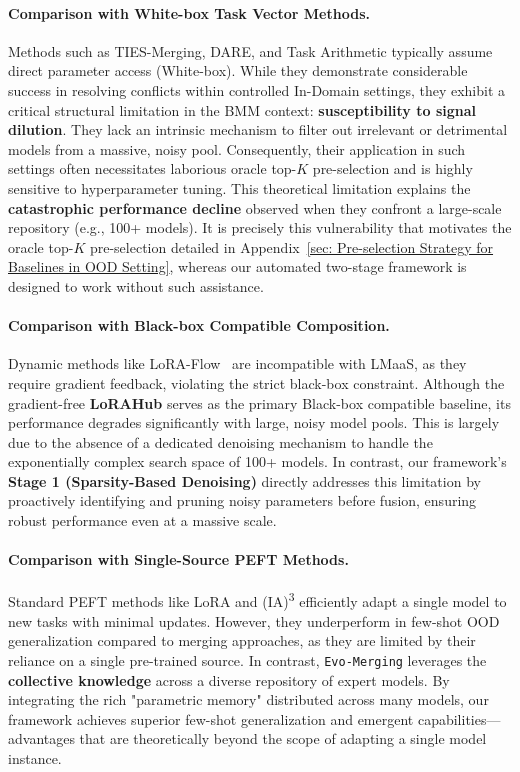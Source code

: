 \paragraph{Comparison with White-box Task Vector Methods.}
Methods such as TIES-Merging, DARE, and Task Arithmetic typically assume direct parameter access (White-box). While they demonstrate considerable success in resolving conflicts within controlled In-Domain settings, they exhibit a critical structural limitation in the BMM context: \textbf{susceptibility to signal dilution}. 
They lack an intrinsic mechanism to filter out irrelevant or detrimental models from a massive, noisy pool. Consequently, their application in such settings often necessitates laborious oracle top-$K$ pre-selection and is highly sensitive to hyperparameter tuning. This theoretical limitation explains the \textbf{catastrophic performance decline} observed when they confront a large-scale repository (e.g., 100+ models). It is precisely this vulnerability that motivates the oracle top-$K$ pre-selection detailed in Appendix~\ref{sec: Pre-selection Strategy for Baselines in OOD Setting}, whereas our automated two-stage framework is designed to work without such assistance.

\paragraph{Comparison with Black-box Compatible Composition.}
Dynamic methods like LoRA-Flow~\cite{wang2024flow} are incompatible with LMaaS, as they require gradient feedback, violating the strict black-box constraint. 
Although the gradient-free \textbf{LoRAHub} serves as the primary Black-box compatible baseline, its performance degrades significantly with large, noisy model pools. This is largely due to the absence of a dedicated denoising mechanism to handle the exponentially complex search space of 100+ models. 
In contrast, our framework's \textbf{Stage 1 (Sparsity-Based Denoising)} directly addresses this limitation by proactively identifying and pruning noisy parameters before fusion, ensuring robust performance even at a massive scale.

\paragraph{Comparison with Single-Source PEFT Methods.}
Standard PEFT methods like LoRA and (IA)\textsuperscript{3} efficiently adapt a single model to new tasks with minimal updates. However, they underperform in few-shot OOD generalization compared to merging approaches, as they are limited by their reliance on a single pre-trained source. 
In contrast, \texttt{Evo-Merging} leverages the \textbf{collective knowledge} across a diverse repository of expert models. By integrating the rich "parametric memory" distributed across many models, our framework achieves superior few-shot generalization and emergent capabilities—advantages that are theoretically beyond the scope of adapting a single model instance.



